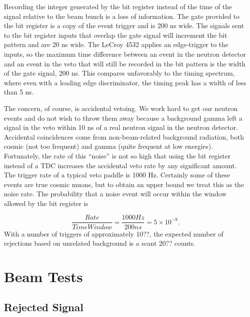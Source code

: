Recording the integer generated by the bit register instead of the time of the signal relative to the beam bunch is a loss of information.  The gate provided to the bit register is a copy of the event trigger and is 200 ns wide.  The signals sent to the bit register inputs that overlap the gate signal will increment the bit pattern and are 20 ns wide.  The LeCroy 4532 applies an edge-trigger to the inputs, so the maximum time difference between an event in the neutron detector and an event in the veto that will still be recorded in the bit pattern is the width of the gate signal, 200 ns.  This compares unfavorably to the timing spectrum, where even with a leading edge discriminator, the timing peak has a width of less than 5 ns.

The concern, of course, is accidental vetoing.  We work hard to get our neutron events and do not wish to throw them away because a background gamma left a signal in the veto within 10 ns of a real neutron signal in the neutron detector.  Accidental coincidences come from non-beam-related background radiation, both cosmic (not too frequent) and gamma (quite frequent at low energies).  Fortunately, the rate of this ``noise'' is not so high that using the bit register instead of a TDC increases the accidental veto rate by any significant amount.  The trigger rate of a typical veto paddle is 1000 Hz.  Certainly some of these events are true cosmic muons, but to obtain an upper bound we treat this as the noise rate.  The probability that a noise event will occur within the window allowed by the bit register is 

\begin{equation}
\frac{Rate}{Time Window} = \frac{1000 Hz}{200 ns} = 5\times10^{-8}.
\end{equation}
With a number of triggers of approximately 10??, the expected number of rejections based on unrelated background is a scant 20?? counts.

\section{Beam Tests}

\subsection{Rejected Signal}

%
% 
% 
